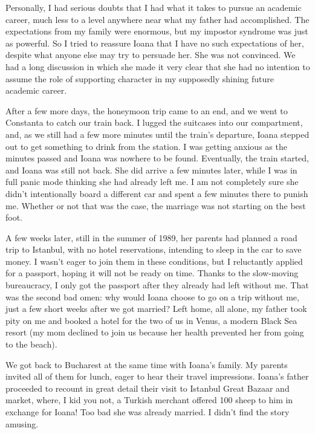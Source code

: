\documentclass[12pt]{book}
\begin{document}
Personally, I had serious doubts that I had what it takes to pursue an
academic career, much less to a level anywhere near what my father had
accomplished. The expectations from my family were enormous, but my
impostor syndrome was just as powerful. So I tried to reassure Ioana
that I have no such expectations of her, despite what anyone else may
try to persuade her. She was not convinced. We had a long discussion in
which she made it very clear that she had no intention to assume the
role of supporting character in my supposedly shining future academic
career.

After a few more days, the honeymoon trip came to an end, and we went to
Constanta to catch our train back. I lugged the suitcases into our
compartment, and, as we still had a few more minutes until the train's
departure, Ioana stepped out to get something to drink from the station.
I was getting anxious as the minutes passed and Ioana was nowhere to be
found. Eventually, the train started, and Ioana was still not back. She
did arrive a few minutes later, while I was in full panic mode thinking
she had already left me. I am not completely sure she didn't
intentionally board a different car and spent a few minutes there to
punish me. Whether or not that was the case, the marriage was not
starting on the best foot.

A few weeks later, still in the summer of 1989, her parents had planned
a road trip to Istanbul, with no hotel reservations, intending to sleep
in the car to save money. I wasn't eager to join them in these
conditions, but I reluctantly applied for a passport, hoping it will not
be ready on time. Thanks to the slow-moving bureaucracy, I only got the
passport after they already had left without me. That was the second bad
omen: why would Ioana choose to go on a trip without me, just a few
short weeks after we got married? Left home, all alone, my father took
pity on me and booked a hotel for the two of us in Venus, a modern Black
Sea resort (my mom declined to join us because her health prevented her
from going to the beach).

We got back to Bucharest at the same time with Ioana's family. My
parents invited all of them for lunch, eager to hear their travel
impressions. Ioana's father proceeded to recount in great detail their
visit to Istanbul Great Bazaar and market, where, I kid you not, a
Turkish merchant offered 100 sheep to him in exchange for Ioana! Too bad
she was already married. I didn't find the story amusing.
\end{document}
